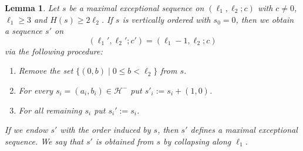 \documentclass[11pt]{article}
\newtheorem{lemma}[theo]{Lemma}
\theoremstyle{definition}
\numberwithin{equation}{section}
\newcommand{\CH}{{\mathcal H}}
\newcommand{\cl}{s}
\newcommand{\mes}{maximal exceptional sequence}
\begin{document}
\begin{lemma}
\label{lem:L1Coll}
Let $\cl$ be a {\mes} on $(\ell_1,\ell_2;c)$ with 
$c\not=0$, $\ell_1\geq3$ and $H(\cl)\geq2\ell_2$. 
If $\cl$ is vertically ordered with $\cl_0=0$, 
then we obtain a sequence $\cl'$ on 
$$
(\ell_1',\ell_2';c')=(\ell_1-1,\ell_2;c)
$$ 
via the following procedure:
\begin{enumerate}
    \item[(i)] Remove the set 
    $\{(0,b)\mid0\leq b<\ell_2\}$ from $\cl$.
    \item[(ii)] For every $\cl_i=(a_i,b_i)\in\CH^-$ 
    put $\cl'_i:=\cl_i+(1,0)$.
    \item[(iii)] For all remaining $\cl_i$ put 
    $\cl_i':=\cl_i$.
\end{enumerate}
If we endow $\cl'$ with the order induced by $\cl$, 
then $\cl'$ defines a {\mes}. We say that $\cl'$ is 
obtained from $\cl$ by {\em collapsing along $\ell_1$}.
\end{lemma}
\end{document}
